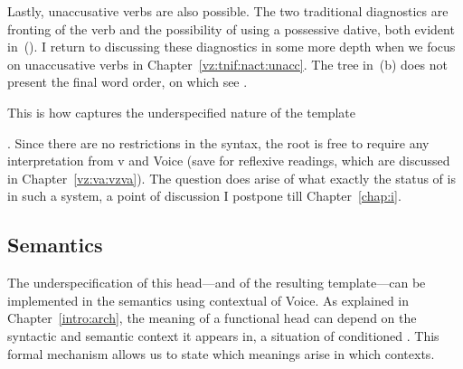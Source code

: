 \begin{exe}
\begin{xlist}
\begin{exe}
\begin{xlist}
\begin{exe}
\begin{xlist}
\begin{exe}
\begin{exe}
\begin{xlist}
\begin{exe}
\begin{xlist}
\begin{exe}
\begin{xlist}
\begin{exe}
\begin{xlist}
\begin{exe}
\begin{xlist}
\begin{exe}
\begin{xlist}
\begin{exe}
\begin{xlist}
\begin{exe}
\begin{xlist}
\begin{exe}
\begin{xlist}
\begin{exe}
\begin{xlist}
\begin{exe}
\begin{xlist}
\begin{exe}
\begin{xlist}
\begin{exe}
\begin{exe}
\begin{xlist}
\begin{exe}
\begin{xlist}
\begin{exe}
\begin{xlist}
Lastly, unaccusative verbs are also possible. The two traditional diagnostics are fronting of the verb and the possibility of using a possessive dative, both evident in~(\nextx). I return to discussing these diagnostics in some more depth when we focus on unaccusative verbs in Chapter~\ref{vz:tnif:nact:unacc}. The tree in~(\anextx b) does not present the final word order, on which see \cite{preminger10}.
 \begin{exe}
 \ex \label{ex:voice-intro-unacc2} 
 \begin{xlist} 
	
 	 \z
\z 		

This is how  captures the underspecified nature of the template {\tkal. Since there are no restrictions in the syntax, the root is free to require any interpretation from v and Voice (save for reflexive readings, which are discussed in Chapter~\ref{vz:va:vzva}). The question does arise of what exactly the status of  is in such a system, a point of discussion I postpone till Chapter~\ref{chap:i}.

		
		\subsection{Semantics} \label{voice:voice:sem}
The underspecification of this head---and of the resulting template---can be implemented in the semantics using contextual  of Voice. As explained in Chapter~\ref{intro:arch}, the meaning of a functional head can depend on the syntactic and semantic context it appears in, a situation of conditioned . This formal mechanism allows us to state which meanings arise in which contexts.

}
\end{xlist}
\end{exe}
\end{xlist}
\end{exe}
\end{xlist}
\end{exe}
\end{xlist}
\end{exe}
\end{exe}
\end{xlist}
\end{exe}
\end{xlist}
\end{exe}
\end{xlist}
\end{exe}
\end{xlist}
\end{exe}
\end{xlist}
\end{exe}
\end{xlist}
\end{exe}
\end{xlist}
\end{exe}
\end{xlist}
\end{exe}
\end{xlist}
\end{exe}
\end{xlist}
\end{exe}
\end{xlist}
\end{exe}
\end{xlist}
\end{exe}
\end{exe}
\end{xlist}
\end{exe}
\end{xlist}
\end{exe}
\end{xlist}
\end{exe}

